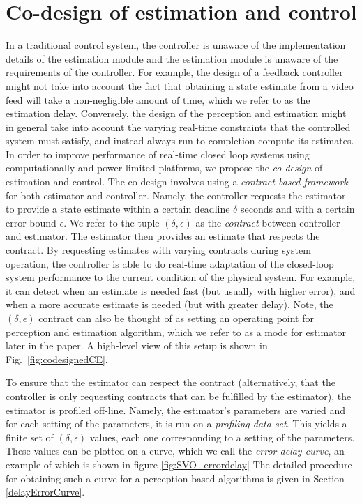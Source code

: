 \section{Co-design of estimation and control}
\label{sec:codesign}

In a traditional control system, %
the controller is unaware of the implementation details of the estimation module and the estimation module is unaware of the requirements of the controller.
For example, the design of a feedback controller might not take into account the fact that obtaining a state estimate from a video feed will take a non-negligible amount of time, which we refer to as the estimation delay.
Conversely, the design of the perception and estimation might in general take into account the varying real-time constraints that the controlled system must satisfy, and instead always run-to-completion compute its estimates.
In order to improve performance of real-time closed loop systems using computationally and power limited platforms, we propose the \emph{co-design} of estimation and control.
The co-design involves using a \emph{contract-based framework} for both estimator and controller.
Namely, the controller requests the estimator to provide a state estimate within a certain deadline $\delta$ seconds and with a certain error bound $\epsilon$.
We refer to the tuple $(\delta,\epsilon)$ as the \emph{contract} between controller and estimator. 
The estimator then provides an estimate that respects the contract.
By requesting estimates with varying contracts during system operation, the controller is able to do real-time adaptation of the closed-loop system performance to the current condition of the physical system.
For example, it can detect when an estimate is needed fast (but usually with higher error), and when a more accurate estimate is needed (but with greater delay). Note, the $(\delta,\epsilon)$ contract can also be thought of as setting an operating point for perception and estimation algorithm, which we refer to as a mode for estimator later in the paper.
A high-level view of this setup is shown in Fig.~\ref{fig:codesignedCE}.

To ensure that the estimator can respect the contract (alternatively, that the controller is only requesting contracts that can be fulfilled by the estimator), the estimator is profiled off-line.
Namely, the estimator's parameters are varied and for each setting of the parameters, it is run on a \emph{profiling data set}. 
This yields a finite set of $(\delta,\epsilon)$ values, each one corresponding to a setting of the parameters.
These values can be plotted on a curve, which we call the \emph{error-delay curve}, an example of which is shown in figure \ref{fig:SVO_errordelay}
The detailed procedure for obtaining such a curve for a perception based algorithms is given in Section \ref{delayErrorCurve}.

